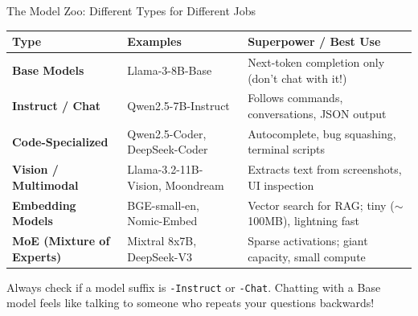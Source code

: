 \documentclass[10pt,aspectratio=169]{beamer}
\begin{document}
\begin{frame}{The Model Zoo: Different Types for Different Jobs}
    \begin{table}
        \scriptsize
        \renewcommand{\arraystretch}{1.15}
        \begin{tabularx}{\textwidth}{@{}l l >{\raggedright\arraybackslash}X@{}}
            \toprule
            \textbf{Type} & \textbf{Examples} & \textbf{Superpower / Best Use} \\
            \midrule
            \textbf{Base Models} & Llama-3-8B-Base & Next-token completion only (don't chat with it!) \\
            \textbf{Instruct / Chat} & Qwen2.5-7B-Instruct & Follows commands, conversations, JSON output \\
            \textbf{Code-Specialized} & Qwen2.5-Coder, DeepSeek-Coder & Autocomplete, bug squashing, terminal scripts \\
            \textbf{Vision / Multimodal} & Llama-3.2-11B-Vision, Moondream & Extracts text from screenshots, UI inspection \\
            \textbf{Embedding Models} & BGE-small-en, Nomic-Embed & Vector search for RAG; tiny ($\sim$100MB), lightning fast \\
            \textbf{MoE (Mixture of Experts)} & Mixtral 8x7B, DeepSeek-V3 & Sparse activations; giant capacity, small compute \\
            \bottomrule
        \end{tabularx}
    \end{table}
    \vspace{0.15cm}
    \begin{tcolorbox}[colback=ShoePrimary!10, colframe=ShoePrimary, title=\textbf{Pro Tip}]
        \scriptsize
        Always check if a model suffix is \texttt{-Instruct} or \texttt{-Chat}. Chatting with a Base model feels like talking to someone who repeats your questions backwards!
    \end{tcolorbox}
\end{frame}
\end{document}
